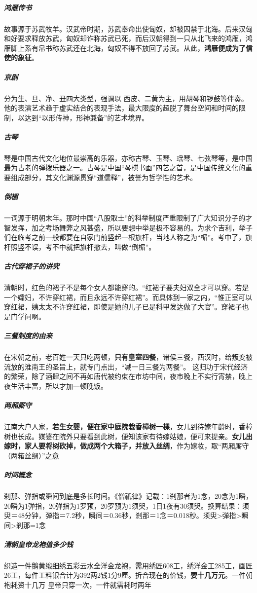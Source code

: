 \documentclass[UTF8,a4paper,12pt]{ctexbook}
\begin{document}
		\subparagraph{鸿雁传书}故事源于苏武牧羊。汉武帝时期，苏武奉命出使匈奴，却被囚禁于北海。后来汉匈和好要求释放苏武，匈奴却诈称苏武已死，而后汉朝得到一只从北飞来的鸿雁，鸿雁脚上系有帛书称苏武还在北海，匈奴不得不放回了苏武。从此，\textbf{鸿雁便成为了信使的象征}。
		
		\subparagraph{京剧}分为生、旦、净、丑四大类型，强调以 西皮、二黄为主，用胡琴和锣鼓等伴奏。他的表演艺术趋于虚实结合的表现手法，最大限度的超脱了舞台空间和时间的限制，以达到“以形传神，形神兼备”的艺术境界。
		
		\subparagraph{古琴}琴是中国古代文化地位最崇高的乐器，亦称古琴、玉琴、瑶琴、七弦琴等，是中国最为古老的弹拨乐器之一。古琴是中国“琴棋书画”四艺之首，是中国传统文化的重要组成部分，其文化渊源贯穿“道儒释”，被誉为哲学性的艺术。
		
		\subparagraph{倒楣}一词源于明朝末年。那时中国“八股取士”的科举制度严重限制了广大知识分子的才智发挥，加之考场舞弊之风甚盛，所以要想中举是极不容易的。为求个吉利，举子们在临考之前一般都要在自家门前竖起一根旗杆，当地人称之为“楣”。考中了，旗杆照竖不误，考不中就把旗杆撤去，叫做“倒楣”。
		
		\subparagraph{古代穿裙子的讲究}清朝时，红色的裙子不是每个女人都能穿的。“红裙子要夫妇双全才可以穿。若是一个孀妇，不许穿红裙，而且永远不许穿红裙”。而具体到一家之内，“惟正室可以穿红裙，姨太太不许穿红裙，即使是她的儿子已是科甲发达做了大官”。穿裙子也是门学问啊。
		
		\subparagraph{三餐制度的由来}在宋朝之前，老百姓一天只吃两顿，\textbf{只有皇室四餐}，诸侯三餐，西汉时，给叛变被流放的淮南王的圣旨上，就专门点出，“减一日三餐为两餐”。 这归功于宋代经济的繁荣，除了酒肆之间不再如唐代被约束在市坊中间，夜市晚上不实行宵禁，晚上夜生活丰富，所以才加一顿晚饭。
		
		\subparagraph{两厢厮守}江南大户人家，\textbf{若生女婴，便在家中庭院栽香樟树一棵}，女儿到待嫁年龄时，香樟树也长成。媒婆在院外只要看到此树，便知该家有待嫁姑娘，便可来提亲。\textbf{女儿出嫁时，家人要将树砍掉，做成两个大箱子，并放入丝绸}，作为嫁妆，取“两厢厮守（两箱丝绸）”之意 ​​​​
		
		\subparagraph{时间概念}刹那、弹指或瞬间到底是多长时间。《僧祇律》记载：1剎那者为1念，20念为1瞬，20瞬为1弹指，20弹指为1罗预，20罗预为1须臾，1日1夜有30须臾。换算结果：须臾＝48分钟，弹指＝7.2秒，瞬间＝0.36秒，剎那＝1念＝0.018秒。须臾>弹指>瞬间>刹那=1念
		
		\subparagraph{清朝皇帝龙袍值多少钱}织造一件鹅黄缎细绣五彩云水全洋金龙袍，需用绣匠608工，绣洋金工285工，画匠26工，每件工料银合计为392两2钱1分9厘。折合现在的价钱，\textbf{要十几万元}。一件朝袍耗资十几万 皇帝只穿一次，一件就需耗时两年
		
\end{document}
